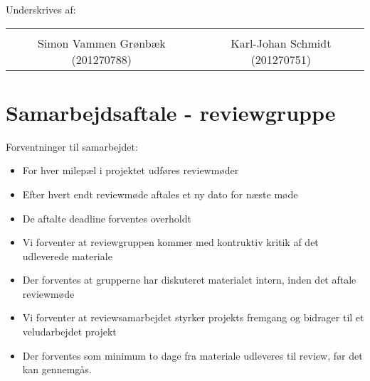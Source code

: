 \hspace{3cm}

Underskrives af: 




\begin{table}[H]
	\centering
	\begin{tabular}{c c}
		\underline{\phantom{mmmmmmmmmmmmmmmmmmmmm}} & \underline{\phantom{mmmmmmmmmmmmmmmmmmmmm}} \\
		Simon Vammen Grønbæk (201270788) \vspace{2cm} & Karl-Johan Schmidt (201270751) \vspace{2cm}\\
	\end{tabular}
\end{table}

\newpage
\section*{Samarbejdsaftale - reviewgruppe}

Forventninger til samarbejdet:
\begin{itemize}
	\item For hver milepæl i projektet udføres reviewmøder
	\item Efter hvert endt reviewmøde aftales et ny dato for næste møde
	\item De aftalte deadline forventes overholdt
	\item Vi forventer at reviewgruppen kommer med kontruktiv kritik af det udleverede materiale
	\item Der forventes at grupperne har diskuteret materialet intern, inden det aftale reviewmøde
	\item Vi forventer at reviewsamarbejdet styrker projekts fremgang og bidrager til et veludarbejdet projekt
	\item Der forventes som minimum to dage fra materiale udleveres til review, før det kan gennemgås. 
\end{itemize}

\hspace{3cm}

